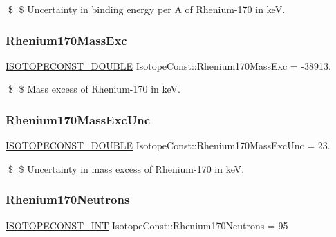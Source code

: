 \$ \$ Uncertainty in binding energy per A of Rhenium-\/170 in keV. \mbox{\label{group___isotope_const-_rhenium-_re170_ga86e761c769ffe7b3929b50682c3e04f7}} 
\subsubsection{\texorpdfstring{Rhenium170\+Mass\+Exc}{Rhenium170MassExc}}
{\footnotesize\ttfamily \mbox{\hyperlink{group___isotope_const-_macros_ga8f45a7272ce02c0b4c65c44636ed719a}{I\+S\+O\+T\+O\+P\+E\+C\+O\+N\+S\+T\+\_\+\+D\+O\+U\+B\+LE}} Isotope\+Const\+::\+Rhenium170\+Mass\+Exc = -\/38913.}

\$ \$ Mass excess of Rhenium-\/170 in keV. \mbox{\label{group___isotope_const-_rhenium-_re170_ga0f972883277c1e2854322f293a838420}} 
\subsubsection{\texorpdfstring{Rhenium170\+Mass\+Exc\+Unc}{Rhenium170MassExcUnc}}
{\footnotesize\ttfamily \mbox{\hyperlink{group___isotope_const-_macros_ga8f45a7272ce02c0b4c65c44636ed719a}{I\+S\+O\+T\+O\+P\+E\+C\+O\+N\+S\+T\+\_\+\+D\+O\+U\+B\+LE}} Isotope\+Const\+::\+Rhenium170\+Mass\+Exc\+Unc = 23.}

\$ \$ Uncertainty in mass excess of Rhenium-\/170 in keV. \mbox{\label{group___isotope_const-_rhenium-_re170_ga1d9043b83089380acdc324a3cd136bfd}} 
\subsubsection{\texorpdfstring{Rhenium170\+Neutrons}{Rhenium170Neutrons}}
{\footnotesize\ttfamily \mbox{\hyperlink{group___isotope_const-_macros_ga5f18360b3e99483a35c32d789e62621c}{I\+S\+O\+T\+O\+P\+E\+C\+O\+N\+S\+T\+\_\+\+I\+NT}} Isotope\+Const\+::\+Rhenium170\+Neutrons = 95}


